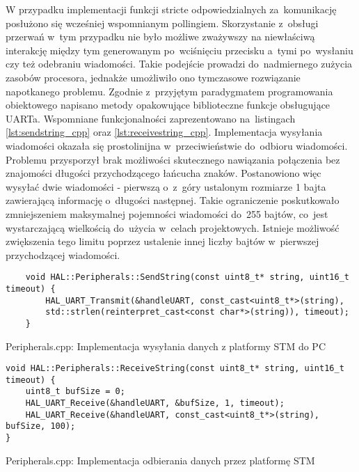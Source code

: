 W przypadku implementacji funkcji stricte odpowiedzialnych za~komunikację posłużono się wcześniej
wspomnianym pollingiem. Skorzystanie z~obsługi przerwań w~tym przypadku nie było możliwe zważywszy na
niewłaściwą interakcję między tym generowanym po~wciśnięciu przecisku a~tymi po~wysłaniu czy też odebraniu
wiadomości. Takie podejście prowadzi do~nadmiernego zużycia zasobów procesora, jednakże umożliwiło ono 
tymczasowe rozwiązanie napotkanego problemu. Zgodnie z~przyjętym paradygmatem programowania obiektowego
napisano metody opakowujące biblioteczne funkcje obsługujące UARTa. Wspomniane funkcjonalności
zaprezentowano na~listingach \ref{lst:sendstring_cpp} oraz \ref{lst:receivestring_cpp}. Implementacja
wysyłania wiadomości okazała się prostolinijna w~przeciwieństwie do~odbioru wiadomości. Problemu
przysporzył brak możliwości skutecznego nawiązania połączenia bez znajomości długości przychodzącego
łańcucha znaków. Postanowiono więc wysyłać dwie wiadomości - pierwszą o~z~góry ustalonym rozmiarze
1 bajta zawierającą informację o~długości następnej. Takie ograniczenie poskutkowało zmniejszeniem
maksymalnej pojemności wiadomości do~255 bajtów, co~jest wystarczającą wielkością do~użycia w~celach
projektowych. Istnieje możliwość zwiększenia tego limitu poprzez ustalenie innej liczby bajtów w~pierwszej
przychodzącej wiadomości. 
\begin{listing}[htb]
\begin{verbatim}
    void HAL::Peripherals::SendString(const uint8_t* string, uint16_t timeout) {
        HAL_UART_Transmit(&handleUART, const_cast<uint8_t*>(string),
        std::strlen(reinterpret_cast<const char*>(string)), timeout);
    }
    \end{verbatim}
    \caption{Peripherals.cpp: Implementacja wysyłania danych z platformy STM do PC}
    \label{lst:sendstring_cpp}
\end{listing}

\begin{listing}[htb]
\begin{verbatim}
void HAL::Peripherals::ReceiveString(const uint8_t* string, uint16_t timeout) {
    uint8_t bufSize = 0;
    HAL_UART_Receive(&handleUART, &bufSize, 1, timeout);
    HAL_UART_Receive(&handleUART, const_cast<uint8_t*>(string), bufSize, 100);
}
\end{verbatim}
\caption{Peripherals.cpp: Implementacja odbierania danych przez platformę STM}
\label{lst:receivestring_cpp}
\end{listing}

